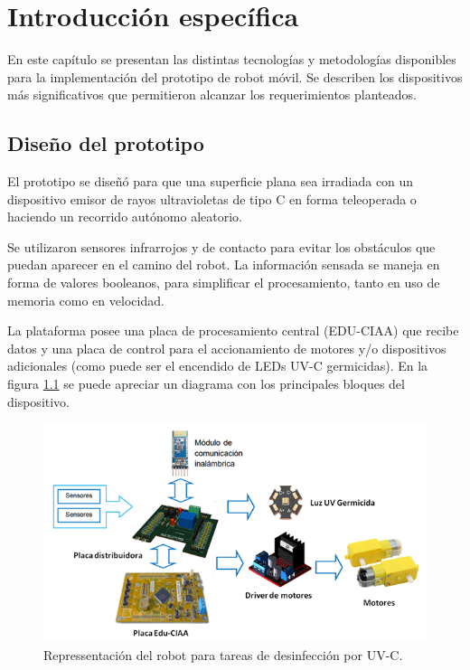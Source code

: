 \chapter{Introducción específica} %

\label{Chapter2}

En este capítulo se presentan las distintas tecnologías y metodologías disponibles para la implementación del prototipo de robot móvil. Se describen los dispositivos más significativos que permitieron alcanzar los requerimientos planteados.

\section{Diseño del prototipo}

El prototipo se diseñó para que una superficie plana sea irradiada con un dispositivo emisor de rayos ultravioletas de tipo C en forma teleoperada o haciendo un recorrido autónomo aleatorio.

Se utilizaron sensores infrarrojos y de contacto para evitar los obstáculos que puedan aparecer en el camino del robot. La información sensada se maneja en forma de valores booleanos, para simplificar el procesamiento, tanto en uso de memoria como en velocidad. 

La plataforma posee una placa de procesamiento central (EDU-CIAA) que recibe datos y una placa de control para el accionamiento de motores y/o dispositivos adicionales (como puede ser el encendido de LEDs UV-C germicidas). En la figura \ref{fig:blocks} se puede apreciar un diagrama con los principales bloques del dispositivo.


\begin{figure}[h]
	\centering
	\includegraphics[width=\textwidth]{./Figures/blocks.png}
	\caption{Repressentación del robot para tareas de desinfección por UV-C.}
	\label{fig:blocks}
\end{figure}

